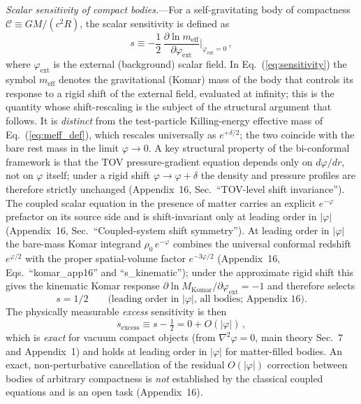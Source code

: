 \documentclass[aps,prd,onecolumn,superscriptaddress,nofootinbib,showpacs,12pt]{revtex4-2}
\begin{document}
\textit{Scalar sensitivity of compact bodies.}---For
a self-gravitating body of compactness
$\mathcal{C} \equiv GM/(c^{2}R)$, the scalar sensitivity
is defined as
\begin{equation}\label{eq:sensitivity}
  s \equiv -\frac{1}{2}\,
  \frac{\partial\ln m_{\mathrm{eff}}}
       {\partial\varphi_{\mathrm{ext}}}
  \bigg|_{\varphi_{\mathrm{ext}}=0}\,,
\end{equation}
where $\varphi_{\mathrm{ext}}$ is the external
(background) scalar field.  In Eq.~(\ref{eq:sensitivity})
the symbol $m_{\mathrm{eff}}$ denotes the gravitational
(Komar) mass of the body that controls its response to a
rigid shift of the external field, evaluated at infinity;
this is the quantity whose shift-rescaling is the subject
of the structural argument that follows.  It is
\emph{distinct} from the test-particle Killing-energy
effective mass of Eq.~(\ref{eq:meff_def}), which rescales
universally as $e^{+\delta/2}$; the two coincide with the
bare rest mass in the limit $\varphi\to 0$.  A key
structural property of the bi-conformal framework is that
the TOV pressure-gradient equation depends only on
$d\varphi/dr$, not on $\varphi$ itself; under a rigid
shift $\varphi\to\varphi+\delta$ the density and
pressure profiles are therefore strictly unchanged
(Appendix~16, Sec.~``TOV-level shift invariance'').
The coupled scalar equation in the presence of matter
carries an explicit $e^{-\varphi}$ prefactor on its
source side and is shift-invariant only at leading order
in $|\varphi|$ (Appendix~16,
Sec.~``Coupled-system shift symmetry'').  At leading order
in $|\varphi|$ the bare-mass Komar integrand
$\rho_0\,e^{-\varphi}$ combines the universal conformal
redshift $e^{\varphi/2}$ with the proper spatial-volume
factor $e^{-3\varphi/2}$ (Appendix~16,
Eqs.~``komar\_app16'' and ``s\_kinematic''); under the
approximate rigid shift this gives the kinematic Komar
response $\partial\ln M_{\mathrm{Komar}}/\partial
\varphi_{\mathrm{ext}}=-1$ and therefore selects
\begin{equation}\label{eq:s_leading}
  s = 1/2\qquad
  \text{(leading order in $|\varphi|$, all bodies;
  Appendix~16).}
\end{equation}
The physically measurable \emph{excess} sensitivity is
then
\begin{equation}\label{eq:s_excess}
  s_{\mathrm{excess}} \equiv s - \tfrac{1}{2}
  = 0 + O(|\varphi|)\,,
\end{equation}
which is \emph{exact} for vacuum compact objects (from
$\nabla^2\varphi = 0$, main theory Sec.~7 and
Appendix~1) and holds at leading order in $|\varphi|$
for matter-filled bodies.  An exact, non-perturbative
cancellation of the residual $O(|\varphi|)$ correction
between bodies of arbitrary compactness is \emph{not}
established by the classical coupled equations and is
an open task (Appendix~16).
\end{document}
